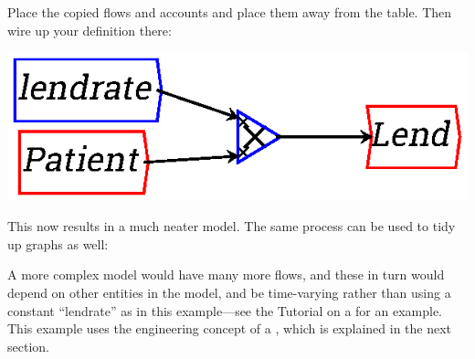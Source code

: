 \begin{center}
\end{center}

Place the copied flows and accounts and place them away from the
table. Then wire up your definition there:


\begin{center}
\includegraphics{images/NewItem154.eps}
\end{center}


This now results in a much neater model. The same process can be used
to tidy up graphs as well:

\begin{center}
\end{center}


A more complex model would have many more flows, and these in turn
would depend on other entities in the model, and be time-varying
rather than using a constant ``lendrate'' as in this example---see the
Tutorial on a  for an
example. This example uses the engineering concept of a
, which is explained in the
next section. 

